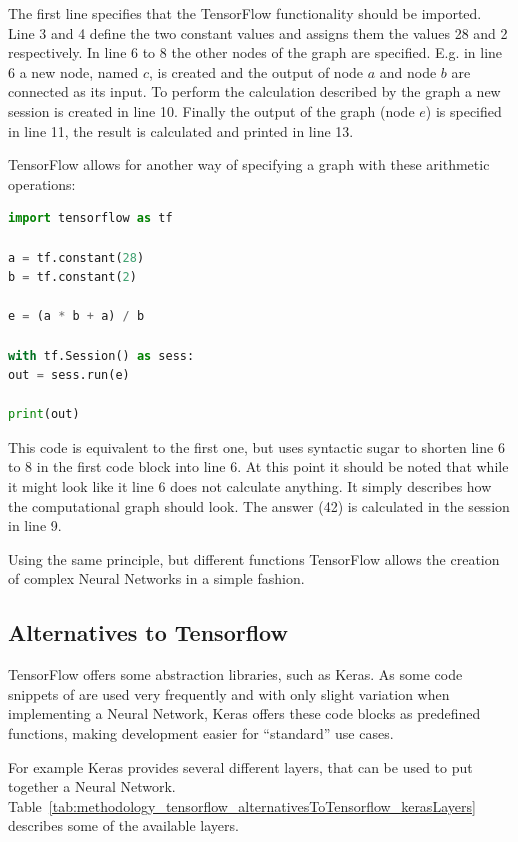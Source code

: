 The first line specifies that the TensorFlow functionality should be imported. Line 3 and 4 define the two constant values and assigns them the values 28 and 2 respectively. In line 6 to 8 the other nodes of the graph are specified. E.g. in line 6 a new node, named $c$, is created and the output of node $a$ and node $b$ are connected as its input. To perform the calculation described by the graph a new session is created in line 10. Finally the output of the graph (node $e$) is specified in line 11, the result is calculated and printed in line 13.

TensorFlow allows for another way of specifying a graph with these arithmetic operations:

\begin{lstlisting}[language=python]
import tensorflow as tf

a = tf.constant(28)
b = tf.constant(2)

e = (a * b + a) / b

with tf.Session() as sess:
out = sess.run(e)

print(out)
\end{lstlisting}

This code is equivalent to the first one, but uses syntactic sugar to shorten line 6 to 8 in the first code block into line 6. At this point it should be noted that while it might look like it line 6 does not calculate anything. It simply describes how the computational graph should look. The answer (42) is calculated in the session in line 9.

Using the same principle, but different functions TensorFlow allows the creation of complex Neural Networks in a simple fashion.

\subsection{Alternatives to Tensorflow}
TensorFlow offers some abstraction libraries, such as Keras. As some code snippets of are used very frequently and with only slight variation when implementing a Neural Network, Keras offers these code blocks as predefined functions, making development easier for ``standard'' use cases.

For example Keras provides several different layers, that can be used to put together a Neural Network. Table~\ref{tab:methodology_tensorflow_alternativesToTensorflow_kerasLayers} describes some of the available layers.

